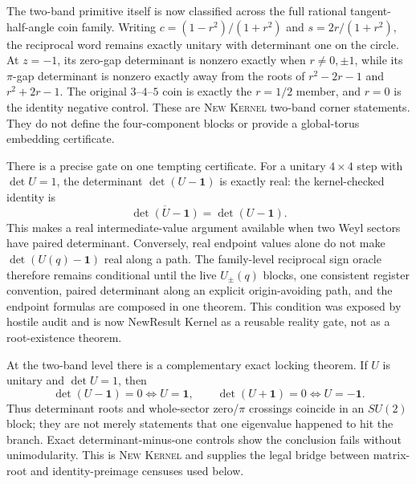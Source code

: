 \documentclass[11pt]{article}
\newcommand{\Kernel}{\textcolor{kernelcolor}{\textsc{Kernel}}}
\newcommand{\NewResult}{\textsc{New}}
\newcommand{\id}{\mathbf{1}}
\begin{document}
The two-band primitive itself is now classified across the full rational
tangent-half-angle coin family.  Writing
$c=(1-r^2)/(1+r^2)$ and $s=2r/(1+r^2)$, the reciprocal word remains exactly
unitary with determinant one on the circle.  At $z=-1$, its zero-gap
determinant is nonzero exactly when $r\ne0,\pm1$, while its $\pi$-gap
determinant is nonzero exactly away from the roots of
$r^2-2r-1$ and $r^2+2r-1$.  The original $3$--$4$--$5$ coin is exactly the
$r=1/2$ member, and $r=0$ is the identity negative control.  These are
\NewResult{} \Kernel{} two-band corner statements.  They do not define the
four-component blocks or provide a global-torus embedding certificate.

There is a precise gate on one tempting certificate.  For a unitary
$4\times4$ step with $\det U=1$, the determinant $\det(U-\id)$ is exactly real:
the kernel-checked identity is
\[
 \overline{\det(U-\id)}=\det(U-\id).
\]
This makes a real intermediate-value argument available when two Weyl sectors
have paired determinant.  Conversely, real endpoint values alone do not make
$\det(U(q)-\id)$ real along a path.  The family-level reciprocal sign oracle
therefore remains conditional until the live $U_\pm(q)$ blocks, one consistent
register convention, paired determinant along an explicit origin-avoiding
path, and the endpoint formulas are composed in one theorem.  This condition
was exposed by hostile audit and is now NewResult{} Kernel{} as a reusable
reality gate, not as a root-existence theorem.

At the two-band level there is a complementary exact locking theorem.  If
$U$ is unitary and $\det U=1$, then
\[
 \det(U-\id)=0\Longleftrightarrow U=\id,
 \qquad
 \det(U+\id)=0\Longleftrightarrow U=-\id.
\]
Thus determinant roots and whole-sector zero/$\pi$ crossings coincide in an
$SU(2)$ block; they are not merely statements that one eigenvalue happened to
hit the branch.  Exact determinant-minus-one controls show the conclusion fails
without unimodularity.  This is \NewResult{} \Kernel{} and supplies the legal
bridge between matrix-root and identity-preimage censuses used below.
\end{document}
